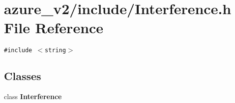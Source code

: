 \section{azure\_\-v2/include/Interference.h File Reference}
\label{Interference_8h}
{\tt \#include $<$string$>$}\par
\subsection*{Classes}
\begin{CompactItemize}
\item 
class \bf{Interference}
\end{CompactItemize}
